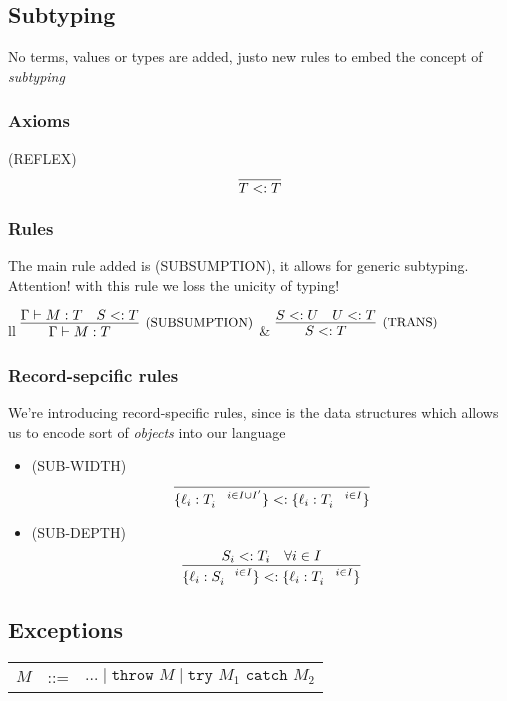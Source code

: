 \documentclass[11pt]{article}
\newcommand{\inferr}[3]{\ensuremath{\infer[\text{\small{(#1)}}]{#2}{#3}}}
\newcommand{\type}[2]{\ensuremath{ #1 : #2 }}
\newcommand{\rec}[1]{\ensuremath{ \{ #1 \} }}
\newcommand{\subt}[2]{\ensuremath{ #1 <: #2 }}
\newcommand{\throw}[1]{\ensuremath{\texttt{throw } #1}}
\newcommand{\tc}[2]{\ensuremath{\texttt{try } #1 \texttt{ catch } #2}}
\begin{document}
\subsection*{Subtyping}
\label{sec:org94436cc}
No terms, values or types are added, justo new rules to embed the
concept of \emph{subtyping}
\subsubsection*{Axioms}
\label{sec:org9436b20}
(REFLEX) \[\infer{\subt{T}{T}}{}\]
\subsubsection*{Rules}
\label{sec:org32d7f76}
The main rule added is (SUBSUMPTION), it allows for generic
subtyping. Attention! with this rule we loss the unicity of
typing!

\begin{center}
\begin{tabular}{ll}
\(\inferr{SUBSUMPTION}{\Gamma\vdash \type{M}{T}}{\Gamma \vdash \type{M}{T} & \subt{S}{T}}\) & \(\inferr{TRANS}{\subt{S}{T}}{\subt{S}{U} & \subt{U}{T}}\)\\
\end{tabular}

\end{center}

\subsubsection*{Record-sepcific rules}
\label{sec:org4152d5e}
We're introducing record-specific rules, since is the data
structures which allows us to encode sort of \emph{objects} into our
language

\begin{itemize}
\item (SUB-WIDTH) \[\infer{\subt{\rec{\type{\ell_i}{T_i}^{\quad i \in
      I\cup I'}}}{\rec{\type{\ell_i}{T_i}^{\quad i \in I}}}}{}\]
\item (SUB-DEPTH) \[\infer{ \subt{ \rec{ \type{\ell_i}{S_i}^{\quad i
      \in I}}}{\rec{\type{\ell_i}{T_i}^{\quad i \in I}}}}
      {\subt{S_i}{T_i}\quad \forall i \in I}\]
\end{itemize}
\subsection*{Exceptions}
\label{sec:org07a8be7}
\begin{center}
\begin{tabular}{lcl}
\(M\) & ::= & \(\dots \mid \throw{M} \mid \tc{M_1}{M_2}\)\\
\end{tabular}

\end{center}
\end{document}
